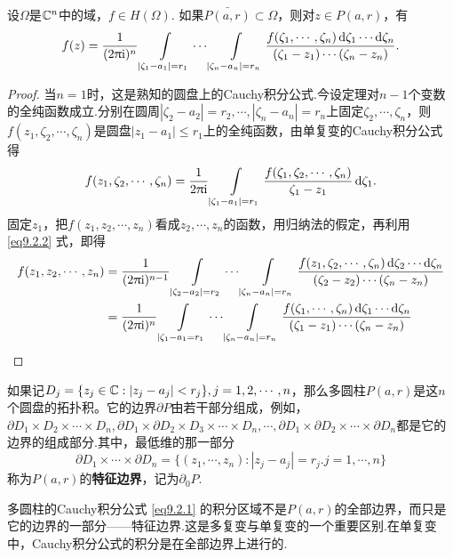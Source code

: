 \begin{theorem}\label{thm9.2.1}
  设$\Omega$是$\mathbb C^n$中的域，$f\in H(\Omega)$. 如果$\bar{P(a,r)}\subset \Omega$，则对$z\in P(a,r)$，有
  \begin{equation}\label{eq9.2.1}
    f(z) = \frac1{(2\uppi\mathrm i)^n}\int\limits_{|\zeta_1-a_1|=r_1}\cdots\int\limits_{|\zeta_n-a_n|=r_n}
    \frac{f(\zeta_1,\cdots,\zeta_n)\mathop{}\!\mathrm{d} \zeta_1\cdots\mathop{}\!\mathrm{d} \zeta_n}{(\zeta_1-z_1)\cdots(\zeta_n-z_n)}.
  \end{equation}
\end{theorem}
\begin{proof}
  当$n=1$时，这是熟知的圆盘上的Cauchy积分公式.今设定理对$n-1$个变数的全纯函数成立.分别在圆周$|\zeta_2-a_2|=r_2,\cdots,|\zeta_n-a_n|=r_n$上固定$\zeta_2,\cdots,\zeta_n$，则$f(z_1,\zeta_2,\cdots,\zeta_n)$是圆盘$|z_1-a_1|\le r_1$上的全纯函数，由单复变的Cauchy积分公式得
  \begin{equation}\label{eq9.2.2}
    f(z_1,\zeta_2,\cdots,\zeta_n) = \frac1{2\uppi\mathrm i}\int\limits_{|\zeta_1-a_1|=r_1}
    \frac{f(\zeta_1,\zeta_2,\cdots,\zeta_n)}{\zeta_1-z_1}\mathop{}\!\mathrm{d} \zeta_1.
  \end{equation}
  固定$z_1$，把$f(z_1,z_2,\cdots,z_n)$看成$z_2,\cdots,z_n$的函数，用归纳法的假定，再利用 \eqref{eq9.2.2} 式，即得
  \begin{align*}
    f(z_1,z_2,\cdots,z_n)&=\frac1{(2\uppi\mathrm i)^{n-1}}\int\limits_{|\zeta_2-a_2|=r_2}\cdots\int\limits_{|\zeta_n-a_n|=r_n}
    \frac{f(z_1,\zeta_2,\cdots,\zeta_n)\mathop{}\!\mathrm{d} \zeta_2\cdots
    \mathop{}\!\mathrm{d} \zeta_n}{(\zeta_2-z_2)\cdots(\zeta_n-z_n)}\\
    & = \frac1{(2\uppi\mathrm i)^n}\int\limits_{|\zeta_1-a_1=r_1} \cdots\int\limits_{|\zeta_n-a_n|=r_n}
    \frac{f(\zeta_1,\cdots,\zeta_n)\mathop{}\!\mathrm{d} \zeta_1\cdots
    \mathop{}\!\mathrm{d} \zeta_n}{(\zeta_1-z_1)\cdots(\zeta_n-z_n)} \qedhere
  \end{align*}
\end{proof}

如果记$D_j=\{z_j\in\mathbb C:|z_j-a_j|<r_j\},j=1,2,\cdots,n$，那么多圆柱$P(a,r)$是这$n$个圆盘的拓扑积。它的边界$\partial P$由若干部分组成，例如，$\partial D_1\times D_2\times\cdots\times D_n,\partial D_1\times\partial D_2\times D_3\times\cdots\times D_n,\cdots,\partial D_1\times\partial D_2\times\cdots\times\partial D_n$都是它的边界的组成部分.其中，最低维的那一部分
\[\partial D_1\times\cdots\times\partial D_n=\{(z_1,\cdots,z_n):|z_j-a_j|=r_j.j=1,\cdots,n\}\]
称为$P(a,r)$的\textbf{特征边界}，记为$\partial_0P$.

多圆柱的Cauchy积分公式 \eqref{eq9.2.1} 的积分区域不是$P(a,r)$的全部边界，而只是它的边界的一部分——特征边界.这是多复变与单复变的一个重要区别.在单复变中，Cauchy积分公式的积分是在全部边界上进行的.

